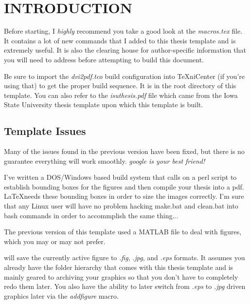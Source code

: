 
\chapter{INTRODUCTION}\label{ch:intro}

Before starting, I \emph{highly} recommend you take a good look at the \emph{macros.tex} file.  It contains a lot of new commands that I added to this thesis template and is extremely useful.  It is also the clearing house for author-specific information that you will need to address before attempting to build this document.
 
Be sure to import the \emph{dvi2pdf.tco} build configuration into TeXniCenter (if you're using that) to get the proper build sequence.  It is in the root directory of this template.  You can also refer to the \emph{isuthesis.pdf} file which came from the Iowa State University thesis template upon which this template is built.

\section{Template Issues}\label{sec:issues}
  
  Many of the issues found in the previous version have been fixed, but there is no guarantee everything will work smoothly.
  \emph{google is your best friend!}

  I've written a DOS/Windows based build system that calls on a perl script to establish bounding boxes for the figures and then compile your thesis into a pdf.
  \LaTeX needs these bounding boxes in order to size the images correctly.
  I'm sure that any Linux user will have no problem hacking make.bat and clean.bat into bash commands in order to accommplish the same thing...

  The previous version of this template used a MATLAB file to deal with figures, which you may or may not prefer.

   will save the currently active figure to \textit{.fig}, \textit{.jpg}, and \textit{.eps} formats.  It assumes you already have the folder hierarchy that comes with this thesis template and is mainly geared to archiving your graphics so that you don't have to completely redo them later.  You also have the ability to later switch from \textit{.eps} to \textit{.jpg} driven graphics later via the \emph{addfigure} macro.

